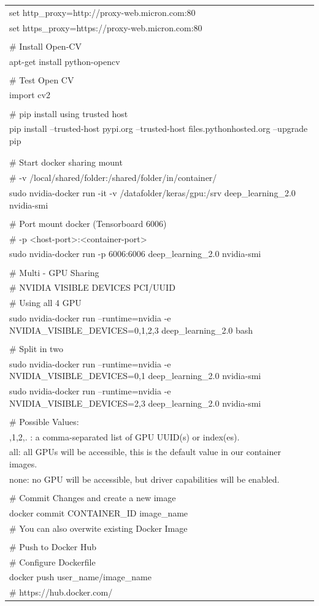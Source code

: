 \documentclass[a4paper]{article}
\begin{document}
{\begin{tabular} { >{\ttfamily}l  }
set http\_proxy=http://proxy-web.micron.com:80\\
set https\_proxy=https://proxy-web.micron.com:80\\
\\
\# Install Open-CV\\
apt-get install python-opencv\\
\\
\# Test Open CV\\
import cv2\\
\\
\# pip install using trusted host\\
pip install --trusted-host pypi.org --trusted-host files.pythonhosted.org --upgrade pip\\
\\
\\
\# Start docker sharing mount\\
\# -v /local/shared/folder:/shared/folder/in/container/\\
sudo nvidia-docker run -it -v /datafolder/keras/gpu:/srv deep\_learning\_2.0 nvidia-smi\\
\\
\# Port mount docker (Tensorboard 6006)\\
\# -p <host-port>:<container-port>\\
sudo nvidia-docker run -p 6006:6006 deep\_learning\_2.0 nvidia-smi\\
\\
\# Multi - GPU Sharing\\
\# NVIDIA VISIBLE DEVICES PCI/UUID \\
\# Using all 4 GPU\\
sudo nvidia-docker run --runtime=nvidia -e NVIDIA\_VISIBLE\_DEVICES=0,1,2,3 deep\_learning\_2.0 bash\\
\\
\# Split in two\\
sudo nvidia-docker run --runtime=nvidia -e NVIDIA\_VISIBLE\_DEVICES=0,1 deep\_learning\_2.0 nvidia-smi\\
sudo nvidia-docker run --runtime=nvidia -e NVIDIA\_VISIBLE\_DEVICES=2,3 deep\_learning\_2.0 nvidia-smi\\
\\
\# Possible Values:\\
0,1,2,. : a comma-separated list of GPU UUID(s) or index(es).\\
all: all GPUs will be accessible, this is the default value in our container images.\\
none: no GPU will be accessible, but driver capabilities will be enabled.\\
\\
\# Commit Changes and create a new image\\
docker commit CONTAINER\_ID image\_name\\
\# You can also overwite existing Docker Image\\
\\
\# Push to Docker Hub\\
\# Configure Dockerfile\\
docker push user\_name/image\_name\\
\# https://hub.docker.com/\\


\end{tabular}}
\end{document}
